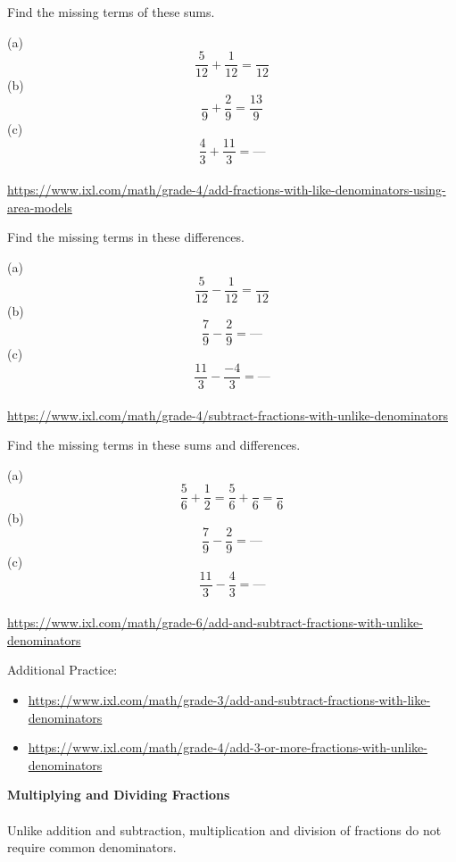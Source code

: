 \begin{exercise}
	Find the missing terms of these sums. 

	(a)	\[\frac{5}{12} + \frac{1}{12} = \frac{ }{12} \]
	(b)	\[\frac{ }{9} + \frac{2}{9} = \frac{13}{9} \]
	(c)	\[\frac{4}{3} + \frac{11}{3} = \text{---} \]
\\ 
	{\footnotesize \url{https://www.ixl.com/math/grade-4/add-fractions-with-like-denominators-using-area-models}}
\end{exercise} 
\begin{exercise}
	Find the missing terms in these differences.  
	
	(a)	\[\frac{5}{12} - \frac{1}{12} = \frac{}{12} \]
	(b)	\[\frac{7}{9} - \frac{2}{9} = \text{---}  \]
	(c)	\[\frac{11}{3} - \frac{-4}{3} = \text{---} \]
\\ 
	{\footnotesize \url{https://www.ixl.com/math/grade-4/subtract-fractions-with-unlike-denominators}}
\end{exercise} 
\begin{exercise}
	Find the missing terms in these sums and differences.  
	
	(a)	\[\frac{5}{6} + \frac{1}{2} = \frac{5}{6} + \frac{}{6} = \frac{}{6} \]
	(b)	\[\frac{7}{9} - \frac{2}{9} = \text{---}  \]
	(c)	\[\frac{11}{3} - \frac{4}{3} = \text{---} \]
\\ 	
	{\footnotesize \url{https://www.ixl.com/math/grade-6/add-and-subtract-fractions-with-unlike-denominators}}
\end{exercise} 
Additional Practice: 
\begin{itemize}
	\item {\footnotesize \url{https://www.ixl.com/math/grade-3/add-and-subtract-fractions-with-like-denominators}}
	\item {\footnotesize \url{https://www.ixl.com/math/grade-4/add-3-or-more-fractions-with-unlike-denominators}}
\end{itemize}





\newpage 
\textbf{Multiplying and Dividing Fractions}
\\ \\ 
Unlike addition and subtraction, multiplication and division of fractions do not require common denominators.  

